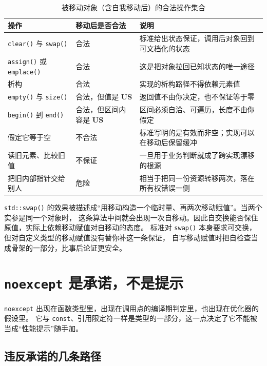 \documentclass[12pt,a4paper,fontset=fandol]{ctexbook}
\newcommand{\Fn}[1]{\texttt{#1()}}
\newcommand{\Tp}[1]{\texttt{#1}}
\newcommand{\USB}{\textbf{\textsf{US}}}
\begin{document}
\begin{table}
\centering
\begin{tabularx}{0.78\textwidth}{>{\raggedright\arraybackslash}p{} X >{\raggedright\arraybackslash}p{}}
\toprule
操作 & 移动后是否合法 & 说明 \\
\midrule
\Fn{clear} 与 \Fn{swap} & 合法 & 标准给出状态保证，调用后对象回到可文档化的状态 \\
\Fn{assign} 或 \Fn{emplace} & 合法 & 这是把对象拉回已知状态的唯一途径 \\
析构 & 合法 & 实现的析构路径不得依赖元素值 \\
\Fn{empty} 与 \Fn{size} & 合法，但值是 \USB{} & 返回值不由你决定，也不保证等于零 \\
\Fn{begin} 到 \Fn{end} & 合法，但区间内容是 \USB{} & 区间必须自洽、可遍历，长度不由你假定 \\
假定它等于空 & 不合法 & 标准写明的是有效而非空；实现可以在移动后保留缓冲 \\
读旧元素、比较旧值 & 不保证 & 一旦用于业务判断就成了跨实现漂移的根源 \\
把旧内部指针交给别人 & 危险 & 相当于把同一份资源转移两次，落在所有权错误一侧 \\
\bottomrule
\end{tabularx}
\caption{被移动对象（含自我移动后）的合法操作集合}\label{tab:ub11-moved-from}
\end{table}

\begin{warning}[title={自交换比自移动更容易被漏掉}]
\Fn{std::swap} 的效果被描述成“用移动构造一个临时量、再两次移动赋值”。当两个实参是同一个对象时，
这条算法中间就会出现一次自移动。因此自交换能否保住原值，实际上依赖移动赋值对自移动的态度。
标准对 \Fn{swap} 本身要求可交换，但对自定义类型的移动赋值没有替你补这一条保证，
自写移动赋值时把自检查当成骨架的一部分，比事后论证更安全。
\end{warning}

\section{\Tp{noexcept} 是承诺，不是提示}\label{sec:ub11-noexcept}

\Tp{noexcept} 出现在函数类型里，出现在调用点的编译期判定里，也出现在优化器的假设里。
它与 \Tp{const}、引用限定符一样是类型的一部分，这一点决定了它不能被当成“性能提示”随手加。

\subsection{违反承诺的几条路径}\label{sec:ub11-noexcept-paths}
\end{document}
